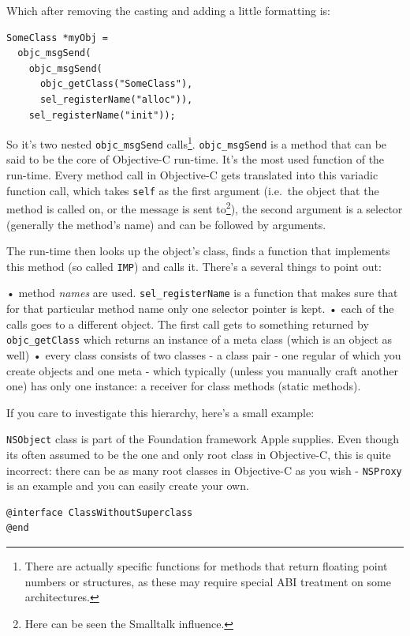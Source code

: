 \documentclass[a4paper, 11pt, fleqn]{book}
\begin{document}
Which after removing the casting and adding a little formatting is:

\begin{verbatim}SomeClass *myObj = 
  objc_msgSend(
    objc_msgSend(
      objc_getClass("SomeClass"),  
      sel_registerName("alloc")), 
    sel_registerName("init"));
\end{verbatim}

So it's two nested \verb=objc_msgSend= calls\footnote{There are actually specific functions for methods that return floating point numbers or structures, as these may require special ABI treatment on some architectures.}. \verb=objc_msgSend= is a method that can be said to be the core of Objective-C run-time. It's the most used function of the run-time. Every method call in Objective-C gets translated into this variadic function call, which takes \verb=self= as the first argument (i.e.\ the object that the method is called on, or the message is sent to\footnote{Here can be seen the Smalltalk influence.}), the second argument is a selector (generally the method's name) and can be followed by arguments.

The run-time then looks up the object's class, finds a function that implements this method (so called \verb=IMP=) and calls it. There's a several things to point out:

• method \emph{names} are used. \verb=sel_registerName= is a function that makes sure that for that particular method name only one selector pointer is kept.
• each of the calls goes to a different object. The first call gets to something returned by \verb=objc_getClass= which returns an instance of a meta class (which is an object as well)
• every class consists of two classes - a class pair - one regular of which you create objects and one meta - which typically (unless you manually craft another one) has only one instance: a receiver for class methods (static methods).

If you care to investigate this hierarchy, here's a small example:

\verb=NSObject= class is part of the Foundation framework Apple supplies. Even though its often assumed to be the one and only root class in Objective-C, this is quite incorrect: there can be as many root classes in Objective-C as you wish - \verb=NSProxy= is an example and you can easily create your own.

\begin{verbatim}@interface ClassWithoutSuperclass
@end\end{verbatim}
\end{document}
